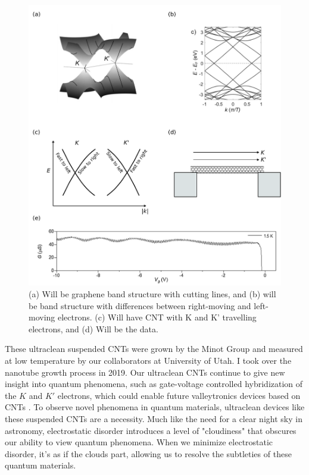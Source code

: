 \documentclass[double,12pt,1in]{beavtex}
\begin{document}
\begin{figure}
    \includegraphics{CNT intro fig}
    \caption{(a) Will be graphene band structure with cutting lines, and (b) will be band structure with differences between right-moving and left-moving electrons. (c) Will have CNT with K and K' travelling electrons, and (d) Will be the data.}
    \label{CNT intro fig}
\end{figure}
These ultraclean suspended CNTs were grown by the Minot Group and measured at low temperature by our collaborators at University of Utah. I took over the nanotube growth process in 2019. Our ultraclean CNTs continue to give new insight into quantum phenomena, such as gate-voltage controlled hybridization of the $K$ and $K'$ electrons, which could enable future valleytronics devices based on CNTs \cite{berg_vernier_2024}. To observe novel phenomena in quantum materials, ultraclean devices like these suspended CNTs are a necessity. Much like the need for a clear night sky in astronomy, electrostatic disorder introduces a level of "cloudiness" that obscures our ability to view quantum phenomena. When we minimize electrostatic disorder, it’s as if the clouds part, allowing us to resolve the subtleties of these quantum materials.
\end{document}
